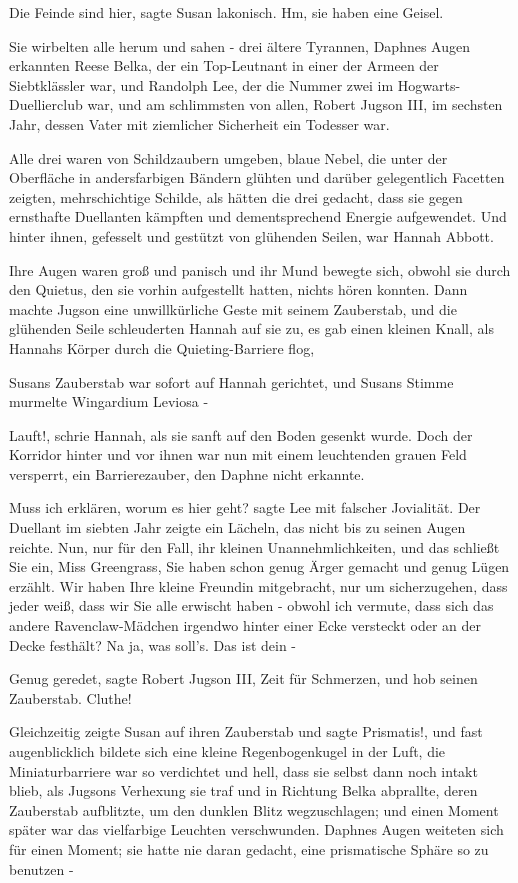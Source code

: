 \glqq Die Feinde sind hier\grqq{}, sagte Susan lakonisch. \glqq Hm, sie haben eine Geisel.\grqq{}

Sie wirbelten alle herum und sahen - drei ältere Tyrannen, Daphnes Augen erkannten Reese Belka, der ein Top-Leutnant in einer der Armeen der Siebtklässler war, und Randolph Lee, der die Nummer zwei im Hogwarts-Duellierclub war, und am schlimmsten von allen, Robert Jugson III, im sechsten Jahr, dessen Vater mit ziemlicher Sicherheit ein Todesser war.

Alle drei waren von Schildzaubern umgeben, blaue Nebel, die unter der Oberfläche in andersfarbigen Bändern glühten und darüber gelegentlich Facetten zeigten, mehrschichtige Schilde, als hätten die drei gedacht, dass sie gegen ernsthafte Duellanten kämpften und dementsprechend Energie aufgewendet.
Und hinter ihnen, gefesselt und gestützt von glühenden Seilen, war Hannah Abbott.

Ihre Augen waren groß und panisch und ihr Mund bewegte sich, obwohl sie durch den Quietus, den sie vorhin aufgestellt hatten, nichts hören konnten. Dann machte Jugson eine unwillkürliche Geste mit seinem Zauberstab, und die glühenden Seile schleuderten Hannah auf sie zu, es gab einen kleinen Knall, als Hannahs Körper durch die Quieting-Barriere flog,

Susans Zauberstab war sofort auf Hannah gerichtet, und Susans Stimme murmelte \glqq Wingardium Leviosa\grqq{} -

\glqq Lauft!\grqq{}, schrie Hannah, als sie sanft auf den Boden gesenkt wurde. Doch der Korridor hinter und vor ihnen war nun mit einem leuchtenden grauen Feld versperrt, ein Barrierezauber, den Daphne nicht erkannte.

\glqq Muss ich erklären, worum es hier geht?\grqq{} sagte Lee mit falscher Jovialität. Der Duellant im siebten Jahr zeigte ein Lächeln, das nicht bis zu seinen Augen reichte. \glqq Nun, nur für den Fall, ihr kleinen Unannehmlichkeiten, und das schließt Sie ein, Miss Greengrass, Sie haben schon genug Ärger gemacht und genug Lügen erzählt. Wir haben Ihre kleine Freundin mitgebracht, nur um sicherzugehen, dass jeder weiß, dass wir Sie alle erwischt haben - obwohl ich vermute, dass sich das andere Ravenclaw-Mädchen irgendwo hinter einer Ecke versteckt oder an der Decke festhält? Na ja, was soll's. Das ist dein -\grqq{}

\glqq Genug geredet\grqq{}, sagte Robert Jugson III, \glqq Zeit für Schmerzen\grqq{}, und hob seinen Zauberstab. \glqq Cluthe!\grqq{}

Gleichzeitig zeigte Susan auf ihren Zauberstab und sagte \glqq Prismatis!\grqq{}, und fast augenblicklich bildete sich eine kleine Regenbogenkugel in der Luft, die Miniaturbarriere war so verdichtet und hell, dass sie selbst dann noch intakt blieb, als Jugsons Verhexung sie traf und in Richtung Belka abprallte, deren Zauberstab aufblitzte, um den dunklen Blitz wegzuschlagen; und einen Moment später war das vielfarbige Leuchten verschwunden. Daphnes Augen weiteten sich für einen Moment; sie hatte nie daran gedacht, eine prismatische Sphäre so zu benutzen -

